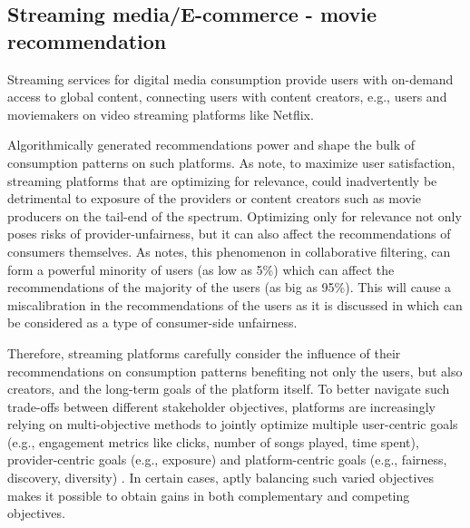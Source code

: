

    \subsection{Streaming media/E-commerce - movie recommendation}

    Streaming services for digital media consumption provide users with on-demand access to global content, connecting users with content creators, e.g., users and moviemakers on video streaming platforms like Netflix.
    
    Algorithmically generated recommendations power and shape the bulk of consumption patterns on such platforms. As \cite{mehrotra2018towards} note, to maximize user satisfaction, streaming platforms that are optimizing for relevance, could inadvertently be detrimental to exposure of the providers or content creators such as movie producers on the tail-end of the spectrum. Optimizing only for relevance not only poses risks of provider-unfairness, but it can also affect the recommendations of consumers themselves. As \cite{eskandanian2019power} notes, this phenomenon in collaborative filtering, can form a powerful minority of users (as low as 5\%) which can affect the recommendations of the majority of the users (as big as 95\%). This will cause a miscalibration in the recommendations of the users as it is discussed in \cite{steck2018calibrated} which can be considered as a type of consumer-side unfairness. 
    
    Therefore, streaming platforms carefully consider the influence of their recommendations on consumption patterns benefiting not only the users, but also creators, and the long-term goals of the platform itself. To better navigate such trade-offs between different stakeholder objectives, platforms are increasingly relying on multi-objective methods to jointly optimize multiple user-centric goals (e.g., engagement metrics like clicks, number of songs played, time spent), provider-centric goals (e.g., exposure) and platform-centric goals (e.g., fairness, discovery, diversity) \cite{mehrotra2020bandit}. In certain cases, aptly balancing such varied objectives makes it possible to obtain gains in both complementary and competing objectives.
    
